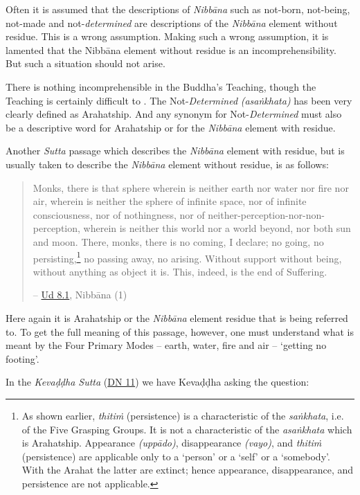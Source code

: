 Often it is assumed that the descriptions of \emph{Nibbāna} such as not-born, not-being, not-made and not-\emph{determined} are descriptions of the \emph{Nibbāna} element without residue. This is a wrong assumption. Making such a wrong assumption, it is lamented that the Nibbāna element without residue is an incomprehensibility. But such a situation should not arise.

There is nothing incomprehensible in the Buddha's Teaching, though the Teaching is certainly difficult to . The Not-\emph{Determined} \emph{(asaṅkhata)} has been very clearly defined as Arahatship. And any synonym for Not-\emph{Determined} must also be a descriptive word for Arahatship or for the \emph{Nibbāna} element with residue.

Another \emph{Sutta} passage which describes the \emph{Nibbāna} element with residue, but is usually taken to describe the \emph{Nibbāna} element without residue, is as follows:

\begin{quote}
Monks, there is that sphere wherein is neither earth nor water nor fire nor air, wherein is neither the sphere of infinite space, nor of infinite consciousness, nor of nothingness, nor of neither-perception-nor-non-perception, wherein is neither this world nor a world beyond, nor both sun and moon. There, monks, there is no coming, I declare; no going, no persisting,\footnote{As shown earlier, \emph{thitiṁ} (persistence) is a characteristic of the \emph{saṅkhata}, i.e. of the Five Grasping Groups. It is not a characteristic of the \emph{asaṅkhata} which is Arahatship. Appearance \emph{(uppādo)}, disappearance \emph{(vayo)}, and \emph{thitiṁ} (persistence) are applicable only to a `person' or a `self' or a `somebody'. With the Arahat the latter are extinct; hence appearance, disappearance, and persistence are not applicable.} no passing away, no arising. Without support without being, without anything as object it is. This, indeed, is the end of Suffering.

 -- \href{https://suttacentral.net/ud8.1/en/anandajoti}{Ud 8.1}, Nibbāna (1)
\end{quote}

Here again it is Arahatship or the \emph{Nibbāna} element  residue that is being referred to. To get the full meaning of this passage, however, one must understand what is meant by the Four Primary Modes -- earth, water, fire and air -- `getting no footing'.

In the \emph{Kevaḍḍha Sutta} (\href{https://suttacentral.net/dn11/en/sujato}{DN 11}) we have Kevaḍḍha asking the question:

